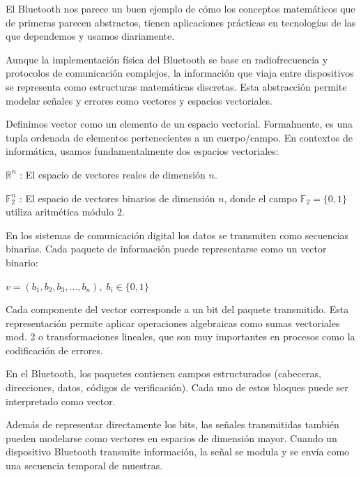 \documentclass[letterpaper,12pt]{article}
\begin{document}
El Bluetooth nos parece un buen ejemplo de cómo los conceptos matemáticos que de primeras
parecen abstractos, tienen aplicaciones prácticas en tecnologías de las que dependemos y usamos
diariamente.





\newpage
{}
Aunque la implementación física del Bluetooth se base en radiofrecuencia y protocolos de
comunicación complejos, la información que viaja entre dispositivos se representa como
estructuras matemáticas discretas. Esta abstracción permite modelar señales y errores como
vectores y espacios vectoriales.

Definimos vector como un elemento de un espacio vectorial. Formalmente, es una tupla ordenada
de elementos pertenecientes a un cuerpo/campo. En contextos de informática, usamos
fundamentalmente dos espacios vectoriales:

$\mathbb{R}^n$ : El espacio de vectores reales de dimensión $n$.

$\mathbb{F}_2^n$ : El espacio de vectores binarios de dimensión $n$, donde el campo $\mathbb{F}_2 = \{0,1\}$ utiliza aritmética
módulo $2$.

En los sistemas de comunicación digital los datos se transmiten como secuencias binarias. Cada
paquete de información puede representarse como un vector binario:

\centerline{$v=(b_1,b_2,b_3,\ldots,b_n),\; b_i\in\{0,1\}$}

Cada componente del vector corresponde a un bit del paquete transmitido. Esta representación
permite aplicar operaciones algebraicas como sumas vectoriales mod. 2 o transformaciones
lineales, que son muy importantes en procesos como la codificación de errores.

En el Bluetooth, los paquetes contienen campos estructurados (cabeceras, direcciones, datos,
códigos de verificación). Cada uno de estos bloques puede ser interpretado como vector.





\newpage
{}
Además de representar directamente los bits, las señales transmitidas también pueden modelarse
como vectores en espacios de dimensión mayor. Cuando un dispositivo Bluetooth transmite
información, la señal se modula y se envía como una secuencia temporal de muestras.
\end{document}
